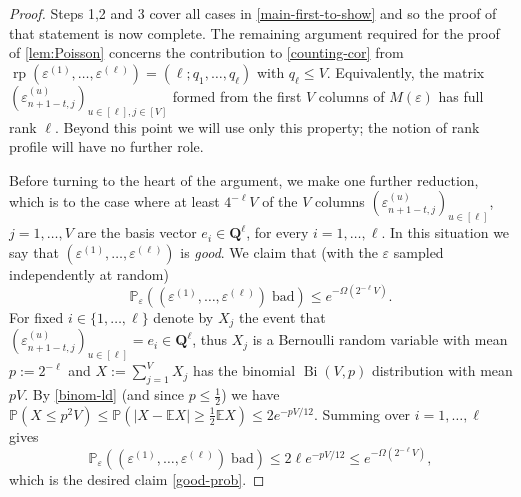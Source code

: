 \documentclass[11pt,reqno]{amsart}
\numberwithin{equation}{section}
\theoremstyle{definition}
\theoremstyle{remark}
\newcommand{\mb}{\mathbb}
\newcommand{\mbf}{\mathbf}
\newcommand{\eps}{\varepsilon}
\newcommand\rp{\operatorname{rp}}
\renewcommand{\le}{\leqslant}
\renewcommand{\ge}{\geqslant}
\begin{document}
\begin{proof}
Steps 1,2 and 3 cover all cases in \cref{main-first-to-show} and so the proof of that statement is now complete. The remaining argument required for the proof of \cref{lem:Poisson} concerns the contribution to \cref{counting-cor} from $\rp(\eps^{(1)},\dots, \eps^{(\ell)}) = (\ell; q_1,\dots, q_{\ell})$ with $q_{\ell} \le V$. Equivalently, the matrix $(\eps^{(u)}_{n + 1 -t,j})_{u \in [\ell], j \in [V]}$ formed from the first $V$ columns of $M(\eps)$ has full rank $\ell$. Beyond this point we will use only this property; the notion of rank profile will have no further role.

Before turning to the heart of the argument, we make one further reduction, which is to the case where at least $4^{-\ell} V$ of the $V$ columns $(\eps_{n + 1 - t,j}^{(u)})_{u \in [\ell]}$, $j = 1,\dots, V$ are the basis vector $e_i \in \mbf{Q}^{\ell}$, for every $i = 1,\dots, \ell$. In this situation we say that $(\eps^{(1)},\dots, \eps^{(\ell)})$ is \emph{good}. We claim that (with the $\eps$ sampled independently at random)
\begin{equation}\label{good-prob} \mb{P}_{\eps} ((\eps^{(1)},\dots, \eps^{(\ell)}) \; \mbox{bad}) \le e^{-\Omega(2^{-\ell} V)}.\end{equation}
For fixed $i \in \{1,\dots, \ell\}$ denote by $X_j$ the event that $(\eps_{n + 1 - t,j}^{(u)})_{u \in [\ell]} =  e_i \in \mbf{Q}^{\ell}$, thus $X_j$ is a Bernoulli random variable with mean $p := 2^{-\ell}$ and $X := \sum_{j = 1}^V X_j$ has the binomial $\operatorname{Bi}(V,p)$ distribution with mean $pV$. By \cref{binom-ld} (and since $p \le \frac{1}{2}$) we have $\mb{P}(X\le p^2 V) \le  \mb{P}( |X - \mb{E} X| \ge \frac{1}{2} \mb{E} X) \le 2 e^{-pV/12}$. Summing over $i = 1,\dots, \ell$ gives 
\[ \mb{P}_{\eps} ((\eps^{(1)},\dots, \eps^{(\ell)}) \; \mbox{bad}) \le  2\ell e^{-pV/12} \le e^{-\Omega(2^{-\ell} V)},\] which is the desired claim \cref{good-prob}.



\end{proof}
\end{document}
